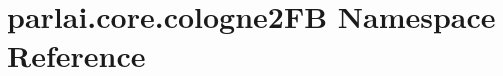 \hypertarget{namespaceparlai_1_1core_1_1cologne2FB}{}\section{parlai.\+core.\+cologne2\+FB Namespace Reference}
\label{namespaceparlai_1_1core_1_1cologne2FB}
